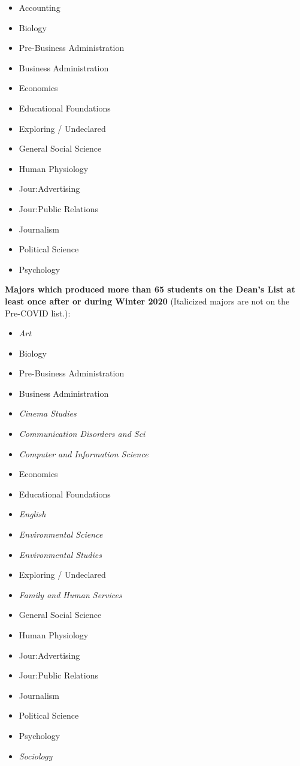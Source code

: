 \documentclass[10pt]{article}
\begin{document}
\begin{itemize}
\item Accounting
\item Biology
\item Pre-Business Administration
\item Business Administration
\item Economics
\item Educational Foundations
\item Exploring / Undeclared
\item General Social Science
\item Human Physiology
\item Jour:Advertising
\item Jour:Public Relations
\item Journalism
\item Political Science
\item Psychology
\end{itemize}


\textbf{Majors which produced more than 65 students on the Dean's List at least once after or during Winter 2020} (Italicized majors are not on the Pre-COVID list.):

\begin{itemize}
\item \textit{Art}
\item Biology
\item Pre-Business Administration
\item Business Administration
\item \textit{Cinema Studies}
\item \textit{Communication Disorders and Sci}
\item \textit{Computer and Information Science}
\item Economics
\item Educational Foundations
\item \textit{English}
\item \textit{Environmental Science}
\item \textit{Environmental Studies}
\item Exploring / Undeclared
\item \textit{Family and Human Services}
\item General Social Science
\item Human Physiology
\item Jour:Advertising
\item Jour:Public Relations
\item Journalism
\item Political Science
\item Psychology
\item \textit{Sociology}
\end{itemize}
\end{document}
